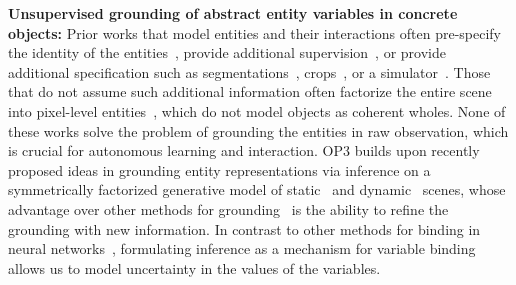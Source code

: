 \textbf{Unsupervised grounding of abstract entity variables in concrete objects:}
Prior works that model entities and their interactions often pre-specify the identity of the entities~\citep{chang2016compositional,battaglia2016interaction,hamrick2017metacontrol,janner2018representation,narasimhan2018grounding,bapst2019structured,ajay2019combining}, provide additional supervision~\citep{girshick2014rich,he2017mask,wang2018deep,yang2018visual}, or provide additional specification such as segmentations~\citep{janner2018reasoning}, crops~\citep{fragkiadaki2015learning}, or a simulator~\citep{wu2017learning,kansky2017schema}.
Those that do not assume such additional information often factorize the entire scene into pixel-level entities~\citep{santoro2017simple,zambaldi2018deep,du2019task}, which do not model objects as coherent wholes.
None of these works solve the problem of grounding the entities in raw observation, which is crucial for autonomous learning and interaction.
OP3 builds upon recently proposed ideas in grounding entity representations via inference on a symmetrically factorized generative model of static~\citep{greff2015binding,greff2017neural,greff2019iodine} and dynamic~\citep{van2018relational} scenes, whose advantage over other methods for grounding~\citep{zhu2019object,eslami2016attend,burgess2019monet,kosiorek2018sequential,watters2019cobra} is the ability to refine the grounding with new information.
In contrast to other methods for binding in neural networks~\citep{levy2008vector,kanerva2009hyperdimensional,smolensky1990tensor,vaswani2017attention}, formulating inference as a mechanism for variable binding allows us to model uncertainty in the values of the variables.

